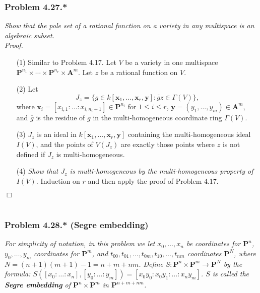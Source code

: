 \documentclass{article}
\begin{document}



\subsubsection*{Problem 4.27.*}
\emph{Show that the pole set of a rational function on a variety in any multispace is
an algebraic subset.} \\



\emph{Proof.}
\begin{enumerate}
\item[(1)]
  Similar to Problem 4.17.
  Let $V$ be a variety in one multispace
  $\mathbf{P}^{n_1} \times \cdots \times \mathbf{P}^{n_r} \times \mathbf{A}^{m}$.
  Let $z$ be a rational function on $V$.

\item[(2)]
  Let
  \[
    J_z = \{ g \in k[\mathbf{x}_1, \ldots, \mathbf{x}_{r}, \mathbf{y}]
      : \overline{g}z \in \Gamma(V) \},
  \]
  where
  $\mathbf{x}_i = [x_{i,1} : \ldots : x_{i,n_i+1}] \in \mathbf{P}^{n_i}$ for $1 \leq i \leq r$,
  $\mathbf{y} = (y_1, \ldots, y_m) \in \mathbf{A}^{m}$,
  and $\overline{g}$ is the residue of $g$ in the multi-homogeneous coordinate ring $\Gamma(V)$.

\item[(3)]
  $J_z$ is an ideal in $k[\mathbf{x}_1, \ldots, \mathbf{x}_{r}, \mathbf{y}]$
  containing the multi-homogeneous ideal $I(V)$,
  and the points of $V(J_z)$ are exactly those points where $z$ is not defined
  if $J_z$ is multi-homogeneous.

\item[(4)]
  \emph{Show that $J_z$ is multi-homogeneous by the multi-homogeneous property of $I(V)$.}
  Induction on $r$ and then apply the proof of Problem 4.17.
\end{enumerate}
$\Box$ \\\\






\subsubsection*{Problem 4.28.* (Segre embedding)}
\emph{For simplicity of notation,
in this problem we let $x_0, \ldots, x_n$ be coordinates for $\mathbf{P}^{n}$,
$y_0, \ldots, y_m$ coordinates for $\mathbf{P}^{m}$,
and $t_{00}, t_{01}, \ldots, t_{0m}, t_{10}, \ldots, t_{nm}$ coordinates $\mathbf{P}^{N}$,
where $N = (n+1)(m+1)-1 = n+m+nm$.
Define $S: \mathbf{P}^{n} \times \mathbf{P}^{m} \to \mathbf{P}^{N}$
by the formula:
$S([x_0 : \ldots : x_n], [y_0 : \ldots : y_m]) = [x_0 y_0 : x_0 y_1 : \ldots : x_n y_m]$.
$S$ is called the \textbf{Segre embedding} of $\mathbf{P}^{n} \times \mathbf{P}^{m}$
in $\mathbf{P}^{n+m+nm}$.}
\end{document}
